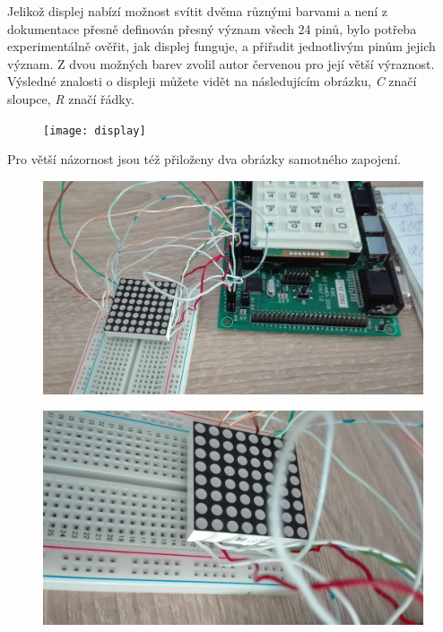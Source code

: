 \documentclass[12pt,a4paper,titlepage]{article}
\begin{document}
Jelikož displej nabízí možnost svítit dvěma různými barvami a není z dokumentace přesně definován přesný význam všech 24  pinů, bylo potřeba experimentálně ověřit, jak displej funguje, a přiřadit jednotlivým pinům jejich význam. Z dvou možných barev zvolil autor červenou pro její větší výraznost. Výsledné znalosti o displeji můžete vidět na následujícím obrázku, \textit{C} značí sloupce, \textit{R} značí řádky.

\begin{figure}[h]
\centering
\texttt{[image: display]}
 \label{display}
\end{figure}



Pro větší názornost jsou též přiloženy dva obrázky samotného zapojení.

\begin{figure}[h]
\centering
\includegraphics[scale=0.1]{fitkit}
 \label{foto}
\end{figure}

\begin{figure}[h]
\centering
\includegraphics[scale=0.1]{fitkit2}
 \label{foto2}
\end{figure}
\end{document}
